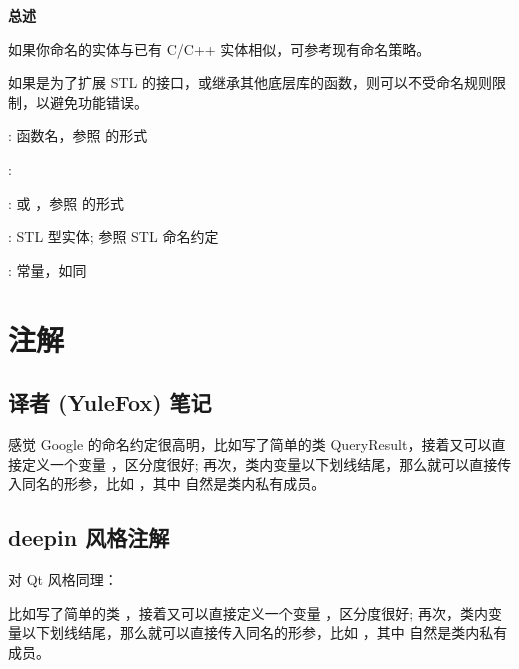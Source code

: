 \textbf{总述}

如果你命名的实体与已有 C/C++ 实体相似，可参考现有命名策略。

\begin{DWarn}
  如果是为了扩展 STL 的接口，或继承其他底层库的函数，则可以不受命名规则限制，以避免功能错误。
\end{DWarn}

: 函数名，参照  的形式

: 

:  或 ，参照  的形式

: STL 型实体; 参照 STL 命名约定

: 常量，如同 

\section{注解}

\subsection{ 译者 (YuleFox) 笔记}

感觉 Google 的命名约定很高明，比如写了简单的类 QueryResult，接着又可以直接定义一个变量 ，区分度很好; 再次，类内变量以下划线结尾，那么就可以直接传入同名的形参，比如  ，其中  自然是类内私有成员。

\subsection{ deepin 风格注解 }

对 Qt 风格同理：

比如写了简单的类 ，接着又可以直接定义一个变量 ，区分度很好; 再次，类内变量以下划线结尾，那么就可以直接传入同名的形参，比如  ，其中  自然是类内私有成员。
